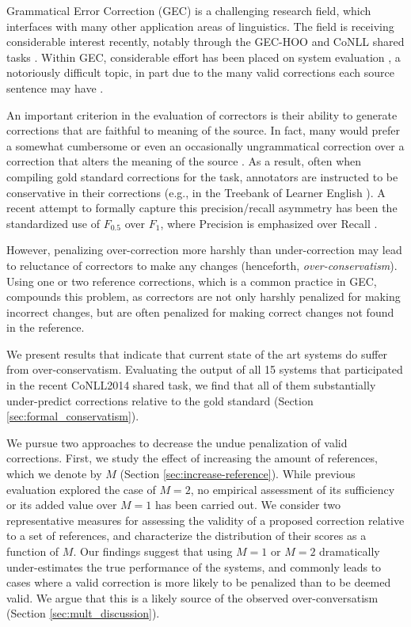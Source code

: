 \documentclass[letter,11pt]{article}
\begin{document}
Grammatical Error Correction (GEC) is a challenging research field, which interfaces with many
other application areas of linguistics. The field is receiving considerable
interest recently, notably through the GEC-HOO \cite{dale2011helping,dale2012hoo} and
CoNLL shared tasks \cite{kao2013conll,ng2014conll}.
Within GEC, considerable effort has been placed on system evaluation
\cite{tetreault2008native,madnani2011they,dahlmeier2012better,felice2015towards,napoles2015ground},
a notoriously difficult topic,
in part due to the many valid corrections each source sentence may have \cite{chodorow2012problems}.

An important criterion in the evaluation of correctors
is their ability to generate corrections that are faithful to meaning of the source. In fact, many would prefer
a somewhat cumbersome or even an occasionally ungrammatical correction over a correction
that alters the meaning of the source \cite{brockett2006correcting}.
As a result, often when compiling gold standard corrections for the task,
annotators are instructed to be conservative in their corrections
(e.g., in the Treebank of Learner English \cite{nicholls2003cambridge}).
A recent attempt to formally capture this precision/recall asymmetry has
been the standardized use of $F_{0.5}$ over $F_{1}$, where Precision is
emphasized over Recall \cite{dahlmeier2012better}.

However, penalizing over-correction more harshly than under-correction
may lead to reluctance of correctors to
make any changes (henceforth, {\it over-conservatism}).
Using one or two reference corrections, which is a common practice in GEC, compounds this problem,
as correctors are not only harshly penalized for making incorrect changes,
but are often penalized for making correct changes not found in the reference.

We present results that indicate that current state of the art systems do suffer
from over-conservatism. Evaluating the output of all 15 systems that participated
in the recent CoNLL2014 shared task, we find that all of them
substantially under-predict corrections relative to the gold standard
(Section \ref{sec:formal_conservatism}).

We pursue two approaches to decrease the undue penalization of valid corrections.
First, we study the effect of increasing the amount of references,
which we denote by $M$ (Section \ref{sec:increase-reference}).
While previous evaluation explored the case of $M=2$,
no empirical assessment of its sufficiency or its added value over $M=1$
has been carried out.
We consider two representative measures for assessing the validity of a
proposed correction relative to a set of references,
and characterize the distribution of their scores as a function of $M$.
Our findings suggest that using $M=1$ or $M=2$ dramatically under-estimates
the true performance of the systems, and commonly leads to cases where a valid
correction is more likely to be penalized than to be
deemed valid. We argue that this is a likely source of the
observed over-conversatism (Section \ref{sec:mult_discussion}).
\end{document}
